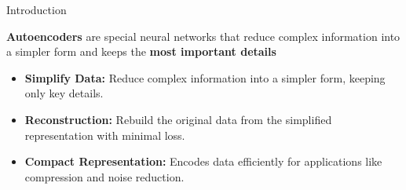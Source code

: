 \documentclass{beamer}
\begin{document}
\begin{frame}{Introduction}
    \begin{tcolorbox}[colback=blue!5!white, colframe=blue!75!black, title=What are Autoencoders?]
        \textbf{\textcolor{blue!70!black}{Autoencoders}} are special neural networks that reduce complex information into a simpler form and keeps the  \textbf{\textcolor{red!70!black}{most important details}}
    \end{tcolorbox}

    \vspace{0.2cm}

    \begin{tcolorbox}[colback=orange!5!white, colframe=orange!75!yellow, title=How Do They Work?]
        \begin{itemize}
            \item \textbf{\textcolor{green!60!black}{Simplify Data:}} Reduce complex information into a simpler form, keeping only key details.
            \item \textbf{\textcolor{orange!80!black}{Reconstruction:}} Rebuild the original data from the simplified representation with minimal loss.
            \item \textbf{\textcolor{purple!70!black}{Compact Representation:}} Encodes data efficiently for applications like compression and noise reduction.
        \end{itemize}
    \end{tcolorbox}

    \vspace{0.3cm}
\end{frame}
\end{document}

